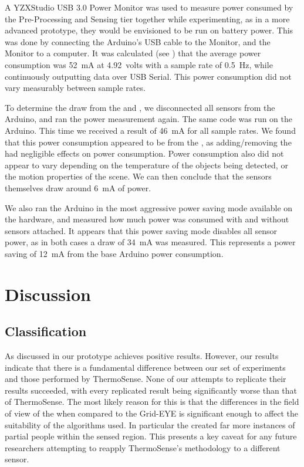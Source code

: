 \documentclass[../thesis/thesis.tex]{subfiles}
\begin{document}
A YZXStudio USB 3.0 Power Monitor was used to measure power consumed by the Pre-Processing and Sensing tier together while experimenting, as in a more advanced prototype, they would be envisioned to be run on battery power. This was done by connecting the Arduino's USB cable to the Monitor, and the Monitor to a computer. It was calculated (see ) that the average power consumption was 52~mA at 4.92~volts with a sample rate of 0.5~Hz, while continuously outputting data over USB Serial. This power consumption did not vary measurably between sample rates.

To determine the draw from the \pir and \iar, we disconnected all sensors from the Arduino, and ran the power measurement again. The same code was run on the Arduino. This time we received a result of 46~mA  for all sample rates. We found that this power consumption appeared to be from the \mlx, as adding/removing the \pir had negligible effects on power consumption. Power consumption also did not appear to vary depending on the temperature of the objects being detected, or the motion properties of the scene. We can then conclude that the sensors themselves draw around 6~mA of power.

We also ran the Arduino in the most aggressive power saving mode available on the hardware, and measured how much power was consumed with and without sensors attached. It appears that this power saving mode disables all sensor power, as in both cases a draw of 34~mA was measured. This represents a power saving of 12~mA from the base Arduino power consumption.

\section{Discussion}

\subsection{Classification}

As discussed in  our prototype achieves positive results. However, our results indicate that there is a fundamental difference between our set of experiments and those performed by ThermoSense. None of our attempts to replicate their results succeeded, with every replicated result being significantly worse than that of ThermoSense. The most likely reason for this is that the differences in the field of view of the \mlx when compared to the Grid-EYE is significant enough to affect the suitability of the algorithms used. In particular the \mlx created far more instances of partial people within the sensed region. This presents a key caveat for any future researchers attempting to reapply ThermoSense's methodology to a different sensor.
\end{document}
